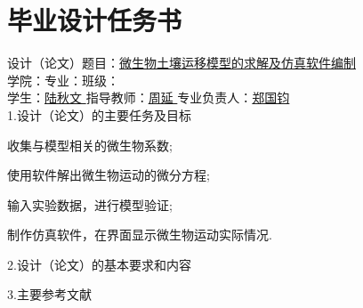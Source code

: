 \chapter*{毕业设计任务书}
{
\setlength{\baselineskip}{30pt}
\noindent 设计（论文）题目：\uline{\hfill 微生物土壤运移模型的求解及仿真软件编制 \hfill} \\
\noindent 学院：\uline{\qquad}\quad 专业：\uline{\quad}\quad 班级：\uline{\hfill} \\
\noindent 学生：\uline{\hfill 陆秋文 \hfill}\quad 指导教师：\uline{\hfill 周延 \hfill} \quad 专业负责人：\uline{\hfill 郑国钧\hfill} \\
\noindent 1.设计（论文）的主要任务及目标\par
\begin{asparaenum}[(1)]
 \item 收集与模型相关的微生物系数;
 \item 使用软件解出微生物运动的微分方程;
 \item 输入实验数据，进行模型验证;
 \item 制作仿真软件，在界面显示微生物运动实际情况.
\end{asparaenum}
2.设计（论文）的基本要求和内容
\begin{asparaenum}[(1)]
 
\end{asparaenum}
3.主要参考文献

}